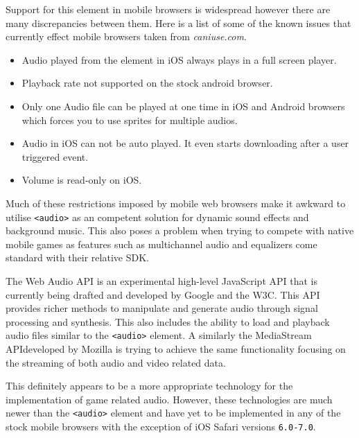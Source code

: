 \documentclass[final]{cmpreport}
\begin{document}
Support for this element in mobile browsers is widespread however there are many discrepancies between them. Here is a list of some of the known issues that currently effect mobile browsers taken from \textit{caniuse.com\footnotemark}.


\begin{itemize}
  \item Audio played from the element in iOS always plays in a full screen player.
  \item Playback rate not supported on the stock android browser.
  \item Only one Audio file can be played at one time in iOS and Android browsers which forces you to use sprites for multiple audios.
  \item Audio in iOS can not be auto played. It even starts downloading after a user triggered event.
  \item Volume is read-only on iOS.
\end{itemize}

Much of these restrictions imposed by mobile web browsers make it awkward to utilise \texttt{<audio>} as an competent solution for dynamic sound effects and background music. This also poses a problem when trying to compete with native mobile games as features such as multichannel audio and equalizers come standard with their relative SDK.

The Web Audio API is an experimental high-level JavaScript API that is currently being drafted and developed by Google and the W3C\footnotemark. This API provides richer methods to manipulate and generate audio through signal processing and synthesis. This also includes the ability to load and playback audio files similar to the \texttt{<audio>} element. A similarly the MediaStream API\footnotemark developed by Mozilla is trying to achieve the same functionality focusing on the streaming of both audio and video related data.


This definitely appears to be a more appropriate technology for the implementation of game related audio. However, these technologies are much newer than the \texttt{<audio>} element and have yet to be implemented in any of the stock mobile browsers with the exception of iOS Safari versions \texttt{6.0-7.0\footnotemark}.
\end{document}
